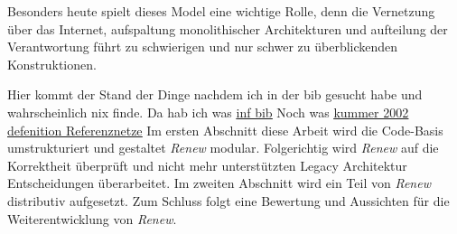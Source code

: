
Besonders heute spielt dieses Model eine wichtige Rolle, denn die Vernetzung über das Internet, aufspaltung monolithischer Architekturen und aufteilung der Verantwortung führt zu  schwierigen und nur schwer zu überblickenden Konstruktionen. 



Hier kommt der Stand der Dinge nachdem ich in der bib gesucht habe und wahrscheinlich nix finde.
Da hab ich was \hyperlink{https://kataloge.uni-hamburg.de/DB=1/SET=1/TTL=1/SHW?FRST=10}{\underline{ inf bib}} 
Noch was \hyperlink{https://kataloge.uni-hamburg.de/DB=1/SET=2/TTL=10/SHW?FRST=6}{\underline{kummer 2002 defenition Referenznetze}}
\bigbreak
Im ersten Abschnitt diese Arbeit wird die Code-Basis umstrukturiert und gestaltet \textit{Renew} modular. Folgerichtig wird \textit{Renew} auf die Korrektheit überprüft und nicht mehr unterstützten Legacy Architektur Entscheidungen überarbeitet. 
Im zweiten Abschnitt wird ein Teil von \textit{Renew} distributiv aufgesetzt.
Zum Schluss folgt eine Bewertung und Aussichten für die Weiterentwicklung von \textit{Renew}.




\linespread{1.25}\selectfont

\tableofcontents %
\setcounter{lofdepth}{4}
 \listoffigures
\blankpage










\blankpage

\begin{appendices}
	
	
	
	
    
	
\end{appendices}

